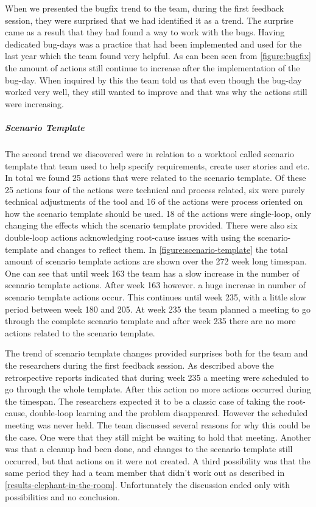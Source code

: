 When we presented the bugfix trend to the team, during the first feedback session, they were surprised that we had identified it as a trend. The surprise came as a result that they had found a way to work with the bugs. Having dedicated bug-days was a practice that had been implemented and used for the last year which the team found very helpful. As can been seen from \autoref{figure:bugfix} the amount of actions still continue to increase after the implementation of the bug-day. When inquired by this the team told us that even though the bug-day worked very well, they still wanted to improve and that was why the actions still were increasing. 

\subparagraph{Scenario Template}\label{results-ca-scenario-template}
The second trend we discovered were in relation to a worktool called scenario template that team used to help specify requirements, create user stories and etc. In total we found 25 actions that were related to the scenario template. Of these 25 actions four of the actions were technical and process related, six were purely technical adjustments of the tool and 16 of the actions were process oriented on how the scenario template should be used. 18 of the actions were single-loop, only changing the effects which the scenario template provided. There were also six double-loop actions acknowledging root-cause issues with using the scenario-template and changes to reflect them. 
In \autoref{figure:scenario-template} the total amount of scenario template actions are shown over the 272 week long timespan. One can see that until week 163 the team has a slow increase in the number of scenario template actions. After week 163 however. a huge increase in number of scenario template actions occur. This continues until week 235, with a little slow period between week 180 and 205. At week 235 the team planned a meeting to go through the complete scenario template and after week 235 there are no more actions related to the scenario template. 

The trend of scenario template changes provided surprises both for the team and the researchers during the first feedback session. As described above the retrospective reports indicated that during week 235 a meeting were scheduled to go through the whole template. After this action no more actions occurred during the timespan. The researchers expected it to be a classic case of taking the root-cause, double-loop learning and the problem disappeared. However the scheduled meeting was never held. The team discussed several reasons for why this could be the case. One were that they still might be waiting to hold that meeting. Another was that a cleanup had been done, and changes to the scenario template still occurred, but that actions on it were not created. A third possibility was that the same period they had a team member that didn't work out as described in \autoref{results-elephant-in-the-room}. Unfortunately the discussion ended only with possibilities and no conclusion. 


